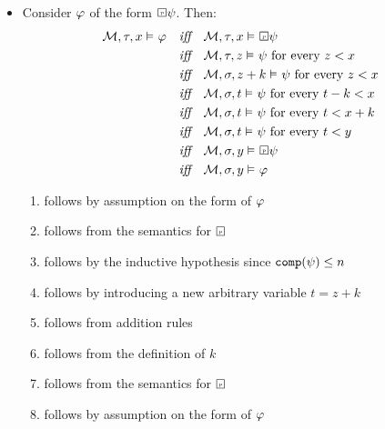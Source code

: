 \documentclass[a4paper, 11pt]{article}                  %
\begin{document}
\begin{enumerate}
{\begin{itemize}
          \item Consider $\varphi$ of the form $\Past\metaB$. Then:
          \setcounter{equation}{0}
          \begin{align}
            \M, \tau, x \MLmodels \metaA \quad \textit{iff}\quad & \M, \tau, x \MLmodels \Past\metaB\\
            \textit{iff}\quad & \M, \tau, z \MLmodels \metaB \text{ for every } z < x\\
            \textit{iff}\quad & \M, \sigma, z+k \MLmodels \metaB \text{ for every } z < x\\
            \textit{iff}\quad & \M, \sigma, t \MLmodels \metaB \text{ for every } t - k < x\\
            \textit{iff}\quad & \M, \sigma, t \MLmodels \metaB \text{ for every } t < x + k\\
            \textit{iff}\quad & \M, \sigma, t \MLmodels \metaB \text{ for every } t < y\\
            \textit{iff}\quad & \M, \sigma, y \MLmodels \Past\metaB\\
            \textit{iff}\quad & \M, \sigma, y \MLmodels \metaA
          \end{align}
          \begin{enumerate}[label=(\arabic*)]
            \item follows by assumption on the form of $\varphi$
            \item follows from the semantics for $\Past$
            \item follows by the inductive hypothesis since $\texttt{comp}(\psi) \le n$
            \item follows by introducing a new arbitrary variable $t = z + k$
            \item follows from addition rules
            \item follows from the definition of $k$
            \item follows from the semantics for $\Past$
            \item follows by assumption on the form of $\varphi$
          \end{enumerate}


\end{itemize}}
\end{enumerate}
\end{document}

